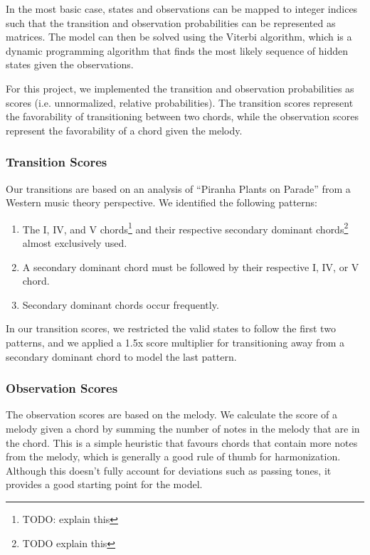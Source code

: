 In the most basic case, states and observations can be mapped to integer indices such that the transition and observation probabilities can be represented as matrices. The model can then be solved using the Viterbi \autocite{HMM:2023} algorithm, which is a dynamic programming algorithm that finds the most likely sequence of hidden states given the observations.

For this project, we implemented the transition and observation probabilities as scores (i.e. unnormalized, relative probabilities). The transition scores represent the favorability of transitioning between two chords, while the observation scores represent the favorability of a chord given the melody.

\subsubsection{Transition Scores}

Our transitions are based on an analysis of ``Piranha Plants on Parade'' from a Western music theory perspective. We identified the following patterns:
\begin{enumerate}
    \item The I, IV, and V chords\footnote{TODO: explain this} and their respective secondary dominant chords\footnote{TODO explain this} almost exclusively used.
    \item A secondary dominant chord must be followed by their respective I, IV, or V chord.
    \item Secondary dominant chords occur frequently.
\end{enumerate}
In our transition scores, we restricted the valid states to follow the first two patterns, and we applied a 1.5x score multiplier for transitioning away from a secondary dominant chord to model the last pattern.

\subsubsection{Observation Scores}

The observation scores are based on the melody. We calculate the score of a melody given a chord by summing the number of notes in the melody that are in the chord. This is a simple heuristic that favours chords that contain more notes from the melody, which is generally a good rule of thumb for harmonization. Although this doesn't fully account for deviations such as passing tones, it provides a good starting point for the model.
